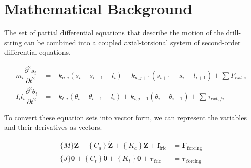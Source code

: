 

\section{Mathematical Background}

The set of partial differential equations that describe the motion of the drill-string can be combined into a coupled axial-torsional system of second-order differential equations.

\begin{align}\label{Governing equations}
     m_{i}\dfrac{\partial^{2}s_{i}}{\partial t^{2}} & = -k_{a,i}(s_{i}-s_{i-1}-l_{i}) + k_{a,j+1}(s_{i+1}-s_{i}-l_{i+1}) + \sum{F_{ext, i}} \\
     I_{i}l_{i}\dfrac{\partial^{2}\theta_{i}}{\partial t^{2}} & = -k_{t,i}(\theta_{i}-\theta_{i-1}-l_{i}) + k_{t,j+1}(\theta_{i}-\theta_{i+1}) + \sum{\tau_{ext,/ i}}
\end{align}

To convert these equation sets into vector form, we can represent the variables and their derivatives as vectors.

\begin{align}
  \{M\} \ddot{\boldsymbol{Z}}+\left\{C_a\right\} \dot{\boldsymbol{Z}}+\left\{K_a\right\} \boldsymbol{Z}+\boldsymbol{f}_{\text{fric}} &= \boldsymbol{F}_{\text{forcing}} \label{eq:em_axial_vector_form}\\
  \{J\} \ddot{\boldsymbol{\theta}}+\left\{C_t\right\} \dot{\boldsymbol{\theta}}+\left\{K_t\right\} \boldsymbol{\theta}+\boldsymbol{\tau}_{\text{fric}} &= \boldsymbol{\tau}_{\text{forcing}} \label{eq:em_torsional_vector_form}
\end{align}


